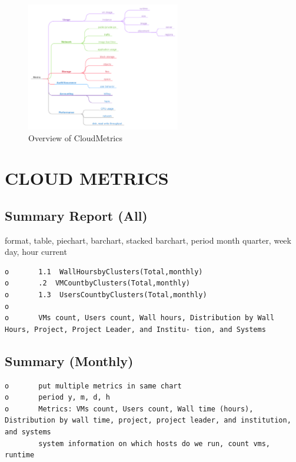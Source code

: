 \documentclass{sig-alternate-05-2015}
\begin{document}
\begin{figure}[htb] 
  \centering 
    \includegraphics[width=0.6\textwidth]{images/cloudmetric-2.pdf} 
  \caption{Overview of CloudMetrics}\label{F:taxonomy-2} 
\end{figure} 



\section{CLOUD METRICS} \label{S:metrics}


\subsection{Summary Report (All)}

                                                                                       
format, table, piechart, barchart, stacked barchart, period month quarter, week day, hour current                                       

\begin{verbatim}
o       1.1  WallHoursbyClusters(Total,monthly)
o       .2  VMCountbyClusters(Total,monthly)
o       1.3  UsersCountbyClusters(Total,monthly)
o       
o       VMs count, Users count, Wall hours, Distribution by Wall Hours, Project, Project Leader, and Institu- tion, and Systems 

\end{verbatim}

\subsection{Summary (Monthly) }

\begin{verbatim}
o       put multiple metrics in same chart
o       period y, m, d, h                                                                                                
o       Metrics: VMs count, Users count, Wall time (hours), Distribution by wall time, project, project leader, and institution, and systems 
        system information on which hosts do we run, count vms, runtime
\end{verbatim}
\end{document}
